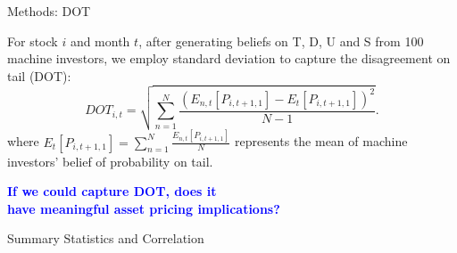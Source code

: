 \documentclass[11pt, aspectratio=169]{beamer}
\newenvironment{wideitemize}{\itemize\addtolength{\itemsep}{10pt}}{\enditemize}
\begin{document}
\begin{frame}{Methods: DOT}
    \bigskip
    \begin{wideitemize}
    \item For stock $i$ and month $t$, after generating beliefs on T, D, U and S from 100 machine investors, we employ standard deviation to capture the \alert{disagreement on tail (DOT)}:
    \begin{equation*}
        DOT_{i,t}=\sqrt{\sum_{n=1}^{N}\frac{\left(E_{n,t}[P_{i,t+1,1}]-E_t[P_{i,t+1,1}]\right)^{2}}{N-1}}.
    \end{equation*}
    where $E_t[P_{i,t+1,1}] = \sum_{n=1}^{N}\frac{E_{n,t}[P_{i,t+1,1}]}{N}$ represents the mean of machine investors' belief of probability on tail.
    \end{wideitemize}
\end{frame}

\begin{frame}
    \begin{center}
        {\Large \textbf{\textcolor{blue}{If we could capture DOT, does it \\[1em] have meaningful \alert{asset pricing implications}?}}}
    \end{center}
\end{frame}

\begin{frame}{Summary Statistics and Correlation}

\end{frame}
\end{document}
